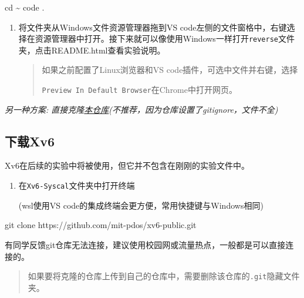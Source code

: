\documentclass[
]{article}
\newenvironment{Shaded}{}{}
\newcommand{\BuiltInTok}[1]{\textcolor[rgb]{0.00,0.50,0.00}{#1}}
\newcommand{\ExtensionTok}[1]{#1}
\newcommand{\FunctionTok}[1]{\textcolor[rgb]{0.02,0.16,0.49}{#1}}
\newcommand{\NormalTok}[1]{#1}
\begin{document}
\begin{Shaded}
	\begin{Highlighting}[]
		\BuiltInTok{cd}\NormalTok{ \textasciitilde{}}
		\ExtensionTok{code}\NormalTok{ .}
	\end{Highlighting}
\end{Shaded}

\begin{enumerate}
	\def\labelenumi{\arabic{enumi}.}
	\item
	      将文件夹从Windows文件资源管理器拖到VS
	      code左侧的文件窗格中，右键选择在资源管理器中打开。接下来就可以像使用Windows一样打开\texttt{reverse}文件夹，点击README.html查看实验说明。

	      \begin{quote}
		      如果之前配置了Linux浏览器和VS code插件，可选中文件并右键，选择

		      \texttt{Preview\ In\ Default\ Browser}在Chrome中打开网页。
	      \end{quote}
\end{enumerate}

\emph{另一种方案:
	直接克隆\href{https://github.com/julymiaw/Operating_System}{本仓库}(不推荐，因为仓库设置了gitignore，文件不全)}

\subsection{下载Xv6}\label{ux4e0bux8f7dxv6}

Xv6在后续的实验中将被使用，但它并不包含在刚刚的实验文件中。

\begin{enumerate}
	\def\labelenumi{\arabic{enumi}.}
	\item
	      在\texttt{Xv6-Syscal}文件夹中打开终端

	      (wsl使用VS code的集成终端会更方便，常用快捷键与Windows相同)
\end{enumerate}

\begin{Shaded}
	\begin{Highlighting}[]
		\FunctionTok{git}\NormalTok{ clone https://github.com/mit{-}pdos/xv6{-}public.git}
	\end{Highlighting}
\end{Shaded}

有同学反馈git仓库无法连接，建议使用校园网或流量热点，一般都是可以直接连接的。

\begin{quote}
	如果要将克隆的仓库上传到自己的仓库中，需要删除该仓库的\texttt{.git}隐藏文件夹。
\end{quote}
\end{document}
